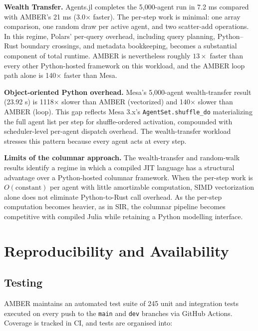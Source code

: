 \documentclass[11pt,a4paper]{article}
\begin{document}
\textbf{Wealth Transfer.} Agents.jl completes the 5{,}000-agent run in 7.2 ms compared with AMBER's 21 ms (3.0$\times$ faster). The per-step work is minimal: one array comparison, one random draw per active agent, and two scatter-add operations. In this regime, Polars' per-query overhead, including query planning, Python--Rust boundary crossings, and metadata bookkeeping, becomes a substantial component of total runtime. AMBER is nevertheless roughly $13\times$ faster than every other Python-hosted framework on this workload, and the AMBER loop path alone is 140$\times$ faster than Mesa.

\textbf{Object-oriented Python overhead.} Mesa's 5{,}000-agent wealth-transfer result (23.92 s) is 1118$\times$ slower than AMBER (vectorized) and 140$\times$ slower than AMBER (loop). This gap reflects Mesa 3.x's \texttt{AgentSet.shuffle\_do} materializing the full agent list per step for shuffle-ordered activation, compounded with scheduler-level per-agent dispatch overhead. The wealth-transfer workload stresses this pattern because every agent acts at every step.

\textbf{Limits of the columnar approach.} The wealth-transfer and random-walk results identify a regime in which a compiled JIT language has a structural advantage over a Python-hosted columnar framework. When the per-step work is $O(\mathrm{constant})$ per agent with little amortizable computation, SIMD vectorization alone does not eliminate Python-to-Rust call overhead. As the per-step computation becomes heavier, as in SIR, the columnar pipeline becomes competitive with compiled Julia while retaining a Python modelling interface.

\section{Reproducibility and Availability}

\subsection{Testing}

AMBER maintains an automated test suite of 245 unit and integration tests executed on every push to the \texttt{main} and \texttt{dev} branches via GitHub Actions. Coverage is tracked in CI, and tests are organised into:
\end{document}
